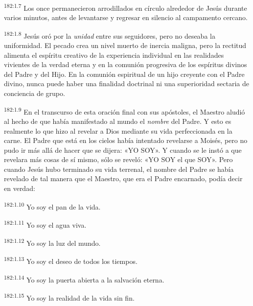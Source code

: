 \par 
\textsuperscript{182:1.7} Los once permanecieron arrodillados en círculo alrededor de Jesús durante varios minutos, antes de levantarse y regresar en silencio al campamento cercano.

\par 
\textsuperscript{182:1.8} Jesús oró por la \textit{unidad} entre sus seguidores, pero no deseaba la uniformidad. El pecado crea un nivel muerto de inercia maligna, pero la rectitud alimenta el espíritu creativo de la experiencia individual en las realidades vivientes de la verdad eterna y en la comunión progresiva de los espíritus divinos del Padre y del Hijo. En la comunión espiritual de un hijo creyente con el Padre divino, nunca puede haber una finalidad doctrinal ni una superioridad sectaria de conciencia de grupo.

\par 
\textsuperscript{182:1.9} En el transcurso de esta oración final con sus apóstoles, el Maestro aludió al hecho de que había manifestado al mundo el \textit{nombre} del Padre. Y esto es realmente lo que hizo al revelar a Dios mediante su vida perfeccionada en la carne. El Padre que está en los cielos había intentado revelarse a Moisés, pero no pudo ir más allá de hacer que se dijera: «YO SOY». Y cuando se le instó a que revelara más cosas de sí mismo, sólo se reveló: «YO SOY el que SOY». Pero cuando Jesús hubo terminado su vida terrenal, el nombre del Padre se había revelado de tal manera que el Maestro, que era el Padre encarnado, podía decir en verdad:

\par 
\textsuperscript{182:1.10} Yo soy el pan de la vida.

\par 
\textsuperscript{182:1.11} Yo soy el agua viva.

\par 
\textsuperscript{182:1.12} Yo soy la luz del mundo.

\par 
\textsuperscript{182:1.13} Yo soy el deseo de todos los tiempos.

\par 
\textsuperscript{182:1.14} Yo soy la puerta abierta a la salvación eterna.

\par 
\textsuperscript{182:1.15} Yo soy la realidad de la vida sin fin.

